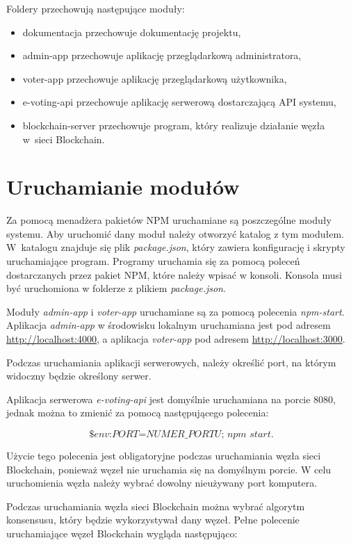 \documentclass[a4paper,12pt]{book}
\begin{document}
Foldery przechowują następujące moduły:
\begin{itemize}
  \item dokumentacja przechowuje dokumentację projektu,
	\item admin-app przechowuje aplikację przeglądarkową administratora,
	\item voter-app przechowuje aplikację przeglądarkową użytkownika,
	\item e-voting-api przechowuje aplikację serwerową dostarczającą API systemu,
	\item blockchain-server przechowuje program, który realizuje działanie węzła w~sieci Blockchain.
\end{itemize}

\section{Uruchamianie modułów}
 
Za pomocą menadżera pakietów NPM uruchamiane są poszczególne moduły systemu. Aby uruchomić dany moduł należy otworzyć katalog z tym modułem. W~katalogu znajduje się plik \textit{package.json}, który zawiera konfigurację i skrypty uruchamiające program. Programy uruchamia się za pomocą poleceń dostarczanych przez pakiet NPM, które należy wpisać w konsoli. Konsola musi być uruchomiona w folderze z plikiem \textit{package.json}.
 
Moduły \textit{admin-app} i \textit{voter-app} uruchamiane są za pomocą polecenia \textit{npm-start}. Aplikacja \textit{admin-app} w środowisku lokalnym uruchamiana jest pod adresem \url{http://localhost:4000}, a aplikacja \textit{voter-app} pod adresem \url{http://localhost:3000}.
 
Podczas uruchamiania aplikacji serwerowych, należy określić port, na którym widoczny będzie określony serwer.
 
Aplikacja serwerowa \textit{e-voting-api} jest domyślnie uruchamiana na porcie 8080, jednak można to zmienić za pomocą następującego polecenia:
 
\begin{equation}
	\textit{\$env:PORT=NUMER\_PORTU; npm start}.
\end{equation}

Użycie tego polecenia jest obligatoryjne podczas uruchamiania węzła sieci Blockchain, ponieważ węzeł nie uruchamia się na domyślnym porcie. W celu uruchomienia węzła należy wybrać dowolny nieużywany port komputera.
 
Podczas uruchamiania węzła sieci Blockchain można wybrać algorytm konsensusu, który będzie wykorzystywał dany węzeł. Pełne polecenie uruchamiające węzeł Blockchain wygląda następująco:
\end{document}
